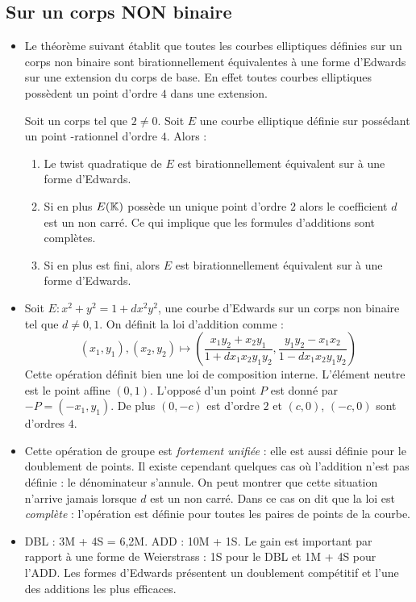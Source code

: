 \documentclass[a4paper]{report}
\begin{document}
\subsection{Sur un corps NON binaire}
\begin{itemize}[label=--]
    \item Le théorème suivant établit que toutes les courbes elliptiques définies sur un corps non binaire sont birationnellement équivalentes à une forme d'Edwards sur une extension du corps de base. En effet toutes courbes elliptiques possèdent un point d'ordre $4$ dans une extension.
    \begin{theoreme}
    Soit \field{} un corps tel que $2 \neq 0$. Soit $E$ une courbe elliptique définie sur \field{} possédant un point \field{}-rationnel d'ordre $4$. Alors :
    \begin{enumerate}
        \item Le twist quadratique de $E$ est birationnellement équivalent sur \field{} à une forme d'Edwards.
        \item Si en plus $E(\mathbb{K}{})$ possède un unique point d'ordre $2$ alors le coefficient $d$ est un non carré. Ce qui implique que les formules d'additions sont complètes.
        \item Si en plus \field{} est fini, alors $E$ est birationnellement équivalent sur \field{} à une forme d'Edwards. 
    \end{enumerate}
    \end{theoreme}
    \item Soit $E : x^2 + y^2 = 1 + dx^2y^2$, une courbe d'Edwards sur un corps \field{} non binaire tel que $d \neq 0, 1$. On définit la loi d'addition comme :
    $$ (x_1, y_1), (x_2, y_2) \mapsto \left ( \frac{x_1y_2 + x_2y_1}{1 + dx_1x_2y_1y_2}, \frac{y_1y_2 - x_1x_2}{1 - dx_1x_2y_1y_2} \right )$$
    Cette opération définit bien une loi de composition interne. L'élément neutre est le point affine  $(0, 1)$. L'opposé d'un point $P$ est donné par $-P = (-x_1, y_1)$. De plus $(0, -c)$ est d'ordre $2$ et $(c, 0)$, $(-c, 0)$ sont d'ordres $4$.
    \item Cette opération de groupe est \emph{fortement unifiée} : elle est aussi définie pour le doublement de points. Il existe cependant quelques cas où l'addition n'est pas définie : le dénominateur s'annule. On peut montrer que cette situation n'arrive jamais lorsque $d$ est un non carré. Dans ce cas on dit que la loi est \emph{complète} : l'opération est définie pour toutes les paires de points de la courbe.
    \item DBL : 3M + 4S = 6,2M. ADD : 10M + 1S. Le gain est important par rapport à une forme de Weierstrass : 1S pour le DBL et 1M + 4S pour l'ADD. Les formes d'Edwards présentent un doublement compétitif et l'une des additions les plus efficaces.

\end{itemize}
\end{document}
